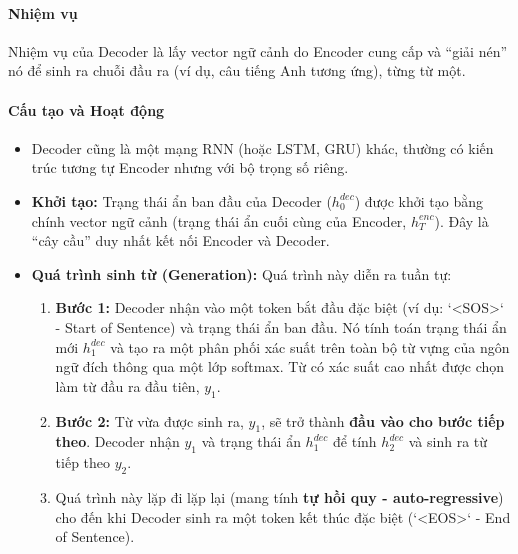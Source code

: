 \paragraph{Nhiệm vụ}
Nhiệm vụ của Decoder là lấy vector ngữ cảnh do Encoder cung cấp và “giải nén” nó để sinh ra chuỗi đầu ra (ví dụ, câu tiếng Anh tương ứng), từng từ một.

\paragraph{Cấu tạo và Hoạt động}
\begin{itemize}
    \item Decoder cũng là một mạng RNN (hoặc LSTM, GRU) khác, thường có kiến trúc tương tự Encoder nhưng với bộ trọng số riêng.
    \item \textbf{Khởi tạo:} Trạng thái ẩn ban đầu của Decoder ($h_0^{dec}$) được khởi tạo bằng chính vector ngữ cảnh (trạng thái ẩn cuối cùng của Encoder, $h_T^{enc}$). Đây là “cây cầu” duy nhất kết nối Encoder và Decoder.
    \item \textbf{Quá trình sinh từ (Generation):} Quá trình này diễn ra tuần tự:
        \begin{enumerate}
            \item \textbf{Bước 1:} Decoder nhận vào một token bắt đầu đặc biệt (ví dụ: `<SOS>` - Start of Sentence) và trạng thái ẩn ban đầu. Nó tính toán trạng thái ẩn mới $h_1^{dec}$ và tạo ra một phân phối xác suất trên toàn bộ từ vựng của ngôn ngữ đích thông qua một lớp softmax. Từ có xác suất cao nhất được chọn làm từ đầu ra đầu tiên, $y_1$.
            \item \textbf{Bước 2:} Từ vừa được sinh ra, $y_1$, sẽ trở thành \textbf{đầu vào cho bước tiếp theo}. Decoder nhận $y_1$ và trạng thái ẩn $h_1^{dec}$ để tính $h_2^{dec}$ và sinh ra từ tiếp theo $y_2$.
            \item Quá trình này lặp đi lặp lại (mang tính \textbf{tự hồi quy - auto-regressive}) cho đến khi Decoder sinh ra một token kết thúc đặc biệt (`<EOS>` - End of Sentence).
        \end{enumerate}
\end{itemize}

